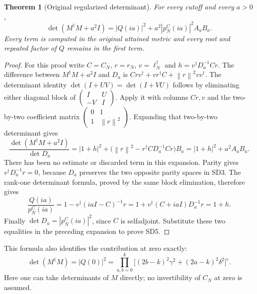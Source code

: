 \documentclass[11pt]{article}
\newcommand{\norm}[1]{\left\lVert#1\right\rVert}
\newtheorem{theorem}{Theorem}\newtheorem{lemma}[theorem]{Lemma}
\begin{document}
\begin{theorem}[Original regularized determinant]
For every cutoff and every $a>0$,
\begin{equation}\tag{SD5}
\boxed{\det(M^\dagger M+a^2I)
=|Q(ia)|^2+a^2|p_N^C(ia)|^2 A_aB_a.}
\end{equation}
Every term is computed in the original attained metric and every root
and repeated factor of $Q$ remains in the first term.
\end{theorem}
\begin{proof}
For this proof write $C=C_N$, $r=r_N$, $v=\ell_N^\dagger$ and
$h=v^\dagger D_a^{-1}Cr$. The difference between $M^\dagger M+a^2I$
and $D_a$ is
$Crv^\dagger+vr^\dagger C+\norm r^2vv^\dagger$.
The determinant identity $\det(I+UV)=\det(I+VU)$ follows by eliminating
either diagonal block of $\left(\begin{smallmatrix}I&U\\-V&I\end{smallmatrix}\right)$.
Apply it with columns $Cr,v$ and the two-by-two coefficient matrix
$\left(\begin{smallmatrix}0&1\\1&\norm r^2\end{smallmatrix}\right)$.
Expanding that two-by-two determinant gives
\[
\frac{\det(M^\dagger M+a^2I)}{\det D_a}
=|1+h|^2+
\bigl(\norm r^2-r^\dagger CD_a^{-1}Cr\bigr)B_a
=|1+h|^2+a^2A_aB_a.
\]
There has been no estimate or discarded term in this expansion.
Parity gives $v^\dagger D_a^{-1}r=0$, because $D_a$ preserves the two
opposite parity spaces in SD3. The rank-one determinant formula,
proved by the same block elimination, therefore gives
\[
\frac{Q(ia)}{p_N^C(ia)}
=1-v^\dagger(iaI-C)^{-1}r
=1+v^\dagger(C+iaI)D_a^{-1}r=1+h.
\]
Finally $\det D_a=|p_N^C(ia)|^2$, since $C$ is selfadjoint. Substitute
these two equalities in the preceding expansion to prove SD5.
\end{proof}

This formula also identifies the contribution at zero exactly:
\begin{equation}\tag{SD6}
\det(M^\dagger M)=|Q(0)|^2
=\prod_{a,b=0}^k\bigl[(2b-k)^2\gamma^2+(2a-k)^2\delta^2\bigr]^e.
\end{equation}
Here one can take determinants of $M$ directly; no invertibility of
$C_N$ at zero is assumed.
\end{document}
